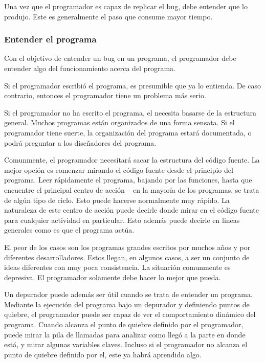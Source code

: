 \documentclass[12pt,legalpaper]{report}
\begin{document}
Una vez que el programador es capaz de replicar el bug, debe entender que lo produjo.  Este es generalmente el paso que consume mayor tiempo.


\subsubsection{Entender el programa}

Con el objetivo de entender un bug en un programa, el programador debe entender algo del funcionamiento acerca del programa.

Si el programador escribió el programa, es presumible que ya lo entienda.  De caso contrario, entonces el programador tiene un problema más serio.

Si el programador no ha escrito el programa, el necesita basarse de la estructura general.  Muchos programas están organizados de una forma sensata.  Si el programador tiene suerte, la organización del programa estará documentada, o podrá preguntar a los diseñadores del programa.

Comunmente, el programador necesitará sacar la estructura del código fuente.  La mejor opción es comenzar mirando el código fuente desde el principio del programa.  Leer rápidamente el programa, bajando por las funciones, hasta que encuentre el principal centro de acción -- en la mayoría de los programas, se trata de algún tipo de ciclo.  Esto puede hacerse normalmente  muy rápido.  La naturaleza de este centro de acción puede decirle donde mirar en el código fuente para cualquier actividad en particular.  Esto además puede decirle en lineas generales como es que el programa actúa.

El peor de los casos son los programas grandes escritos por muchos años y por diferentes desarrolladores.  Estos llegan, en algunos casos, a ser un conjunto de ideas diferentes con muy poca consistencia.  La situación comunmente es depresiva.  El programador solamente debe hacer lo mejor que pueda.

Un depurador puede además ser útil cuando se trata de entender un programa.  Mediante la ejecución del programa bajo un depurador y definiendo puntos de quiebre, el programador puede ser capaz de ver el comportamiento dinámico del programa.  Cuando alcanza el punto de quiebre definido por el programador, puede mirar la pila de llamadas para analizar como llegó a la parte en donde está, y mirar algunas variables claves.  Incluso si el programador no alcanza el punto de quiebre definido por el, este ya habrá aprendido algo.
\end{document}

